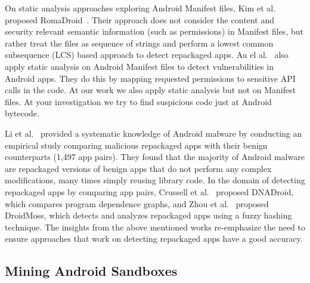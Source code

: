 On static analysis approaches exploring Android Manifest files, Kim et al. proposed RomaDroid~\cite{DBLP:journals/access/KimLCP19}.  Their approach does not consider the content and security relevant semantic information (such as permissions) in Manifest files, but rather treat the files as sequence of strings and perform a lowest common subsequence (LCS) based approach to detect repackaged apps. Au el al.~\cite{DBLP:conf/ccs/AuZHL12} also apply static analysis on Android Manifest files to detect vulnerabilities in Android apps. They do this by mapping requested permissions to sensitive API calls in the code. At our work we also apply static analysis but not on Manifest files. At your investigation we try to find suspicious code just at Android bytecode. %

Li et al.~\cite{DBLP:journals/tifs/0029LBKTLC17} provided a systematic knowledge of Android malware by conducting an empirical study comparing malicious repackaged apps with their benign counterparts (1,497 app pairs). They found that the majority of Android malware are repackaged versions of benign apps that do not perform any complex modifications, many times simply reusing library code.  In the domain of detecting repackaged apps by comparing app pairs, Crussell et al.~\cite{DBLP:conf/esorics/CrussellGC12} proposed  DNADroid, which compares program dependence graphs, and Zhou et al.~\cite{DBLP:conf/codaspy/ZhouZJN12} proposed DroidMoss, which detects and analyzes repackaged apps using a fuzzy hashing technique. The insights from the above mentioned works re-emphasize the need to ensure approaches that work on detecting repackaged apps have a good accuracy. 

\subsection{Mining Android Sandboxes}\label{sec:android-sandbox}

